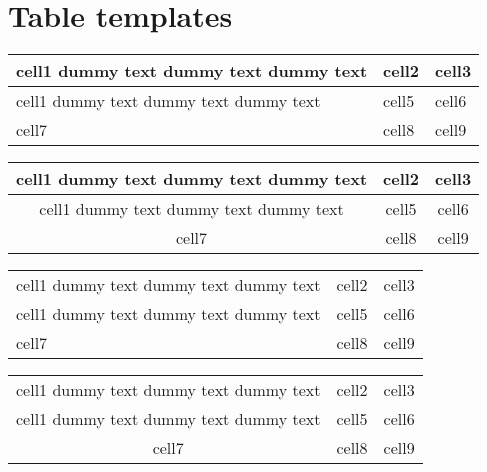 \chapter{Table templates}
\label{tables}


\begin{tabular}{ | m{5em} | m{1cm}| m{1cm} | } 
    \hline
    cell1 dummy text dummy text dummy text& cell2 & cell3 \\ 
    \hline
    cell1 dummy text dummy text dummy text & cell5 & cell6 \\ 
    \hline
    cell7 & cell8 & cell9 \\ 
    \hline
\end{tabular}

\begin{tabular}{ |c|c|c| } 
    \hline
    cell1 dummy text dummy text dummy text& cell2 & cell3 \\ 
    \hline
    cell1 dummy text dummy text dummy text & cell5 & cell6 \\ 
    \hline
    cell7 & cell8 & cell9 \\ 
    \hline
\end{tabular}


\begin{tabular}{ | m{5em} | m{1cm}| m{1cm} | } 
    \hline
    cell1 dummy text dummy text dummy text& cell2 & cell3 \\ 
    \Xhline{1.5pt}
    cell1 dummy text dummy text dummy text & cell5 & cell6 \\ 
    \hline
    cell7 & cell8 & cell9 \\ 
    \hline
\end{tabular}

\begin{tabular}{ |c|c|c| } 
    \hline
    cell1 dummy text dummy text dummy text& cell2 & cell3 \\ 
    \Xhline{1.5pt}
    cell1 dummy text dummy text dummy text & cell5 & cell6 \\ 
    \hline
    cell7 & cell8 & cell9 \\ 
    \hline
\end{tabular}
